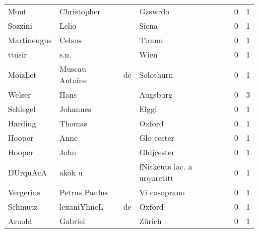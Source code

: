 \begin{center}
\begin{tiny}
\begin{longtabu}{llllrr}
                     Mont &                        Christopher &             &                                     Gzswrdo &          0 &         1 \\
                  Sozzini &                              Lelio &             &                                       Siena &          0 &         1 \\
              Martinengus &                             Celsus &             &                                      Tirano &          0 &         1 \\
                   ttnsir &                               s.n. &             &                                        Wien &          0 &         1 \\
                  MoizLet &                     Museau Antoine &          de &                                   Solothurn &          0 &         1 \\
                   Welser &                               Hans &             &                                    Augsburg &          0 &         3 \\
                 Schlegel &                           Johannes &             &                                       Elggl &          0 &         1 \\
                  Harding &                             Thomas &             &                                      Oxford &          0 &         1 \\
                   Hooper &                               Anne &             &                                  Glo cester &          0 &         1 \\
                   Hooper &                               John &             &                                  Gldjcester &          0 &         1 \\
                 DUrquAcA &                             akok u &             &                 fNitkeuts lac. a urqurctitt &          0 &         1 \\
                Vergerius &                      Petrus Paulus &             &                                Vi cosoprano &          0 &         1 \\
                  Schmutz &                        lexaniYhncL &          de &                                      Oxford &          0 &         1 \\
                   Arnold &                            Gabriel &             &                                      Zürich &          0 &         1 \\

\end{longtabu}
\end{tiny}
\end{center}
